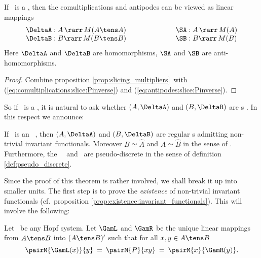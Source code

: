 \begin{lemma_sec} \label{lem:mhs:comultiplications}
If\/ \pairAB\ is a \mhs, then the comultiplications and antipodes can be viewed
as linear mappings
$$ \begin{array}{lcl}
     \DeltaA: A \,\rarr\, M(A \tens A)  & \hspace{5em} &
      \SA:    A \,\rarr\, M(A)  \\
     \DeltaB: B \rarr\, M(B \tens B)  & &
      \SB:     B \rarr\, M(B)
   \end{array} $$
\rm Here $\DeltaA$ and $\DeltaB$ are homomorphisms, $\SA$ and $\SB$ are anti-homomorphisms.
\end{lemma_sec}
\begin{proof}
Combine proposition \ref{prop:slicing_multipliers}\ with
(\ref{eq:comultiplications:slice:Pinverse}) and
(\ref{eq:antipodes:slice:Pinverse}).
\end{proof}
\vspace{2ex}


So if \pairAB\ is a \mhs, it is natural to ask whether $(A,\DeltaA)$ and $(B,\DeltaB)$
are \mha s \cite{Fons:MHA}\@. In this respect we announce:

\begin{thm_sec} \label{thm:mhs_yields_mha}
If\/ \pairAB\ is an \mr\ \mhs,
then $(A,\DeltaA)$ and $(B,\DeltaB)$ are regular \mha s admitting non-trivial invariant
functionals. Moreover $B\simeq \hat{A}$ and $A\simeq \hat{B}$ in the sense of
\cite{Fons:AFGD:proc,Fons:AFGD}\@.
Furthermore, the \contexts\ \Aa\ and\/ \BB\ are pseudo-discrete in the sense of
definition \ref{def:pseudo_discrete}\@.
\end{thm_sec}


Since the proof of this theorem is rather involved, we shall break it up into smaller units.
The first step is to prove the {\em existence\/} of non-trivial invariant functionals
(cf.\ proposition \ref{prop:existence:invariant_functionals}).
This will involve the following:


\begin{defn_sec*} \label{def:GammaLGammaR}
Let \pairAB\ be any Hopf system.
Let $\GamL$ and $\GamR$ be the unique linear mappings from $A\tens B$ into $(A \tens B)'$
such that for all $x,y \in A\tens B$
\begin{equation}\label{eq:def:Gammas}
  \pairM{\GamL(x)}{y} \:=\:    \pairM{P}{xy}  \:=\:  \pairM{x}{\GamR(y)}.
\end{equation}
\end{defn_sec*}


